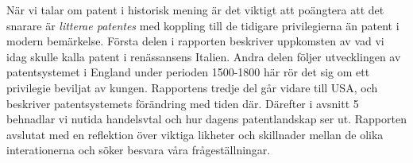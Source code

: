 När vi talar om patent i historisk mening är det viktigt att poängtera att det 
snarare är \emph{litterae patentes} med koppling till de tidigare 
privilegierna än patent i modern bemärkelse. Första delen i rapporten beskriver
uppkomsten av vad vi idag skulle kalla patent i renässansens Italien.
Andra delen följer utvecklingen av patentsystemet i England under perioden
1500-1800 här rör det sig om ett privilegie beviljat av kungen. Rapportens tredje del går vidare till USA, och beskriver patentsystemets förändring med tiden där. Därefter i avsnitt 5 behnadlar vi nutida handelsvtal och hur dagens patentlandskap ser ut. Rapporten avslutat med en reflektion över viktiga likheter och skillnader mellan de olika interationerna och söker besvara våra frågeställningar.

